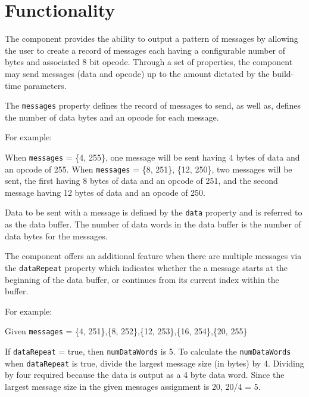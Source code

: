 \section*{Functionality}
\begin{flushleft}

The {\comp} component provides the ability to output a pattern of messages by allowing the user to create a record of messages each having a configurable number of bytes and associated 8 bit opcode. Through a set of properties, the component may send messages (data and opcode) up to the amount dictated by the build-time parameters. \newline

The \texttt{messages} property defines the record of messages to send, as well as, defines the number of data bytes and an opcode for each message. \newline

For example: \newline

When \texttt{messages} = \{4, 255\}, one message will be sent having 4 bytes of data and an opcode of 255. \newline
When \texttt{messages} = \{8, 251\}, \{12, 250\}, two messages will be sent, the first having 8 bytes of data and an opcode of 251, and the second message having 12 bytes of data and an opcode of 250. \newline

Data to be sent with a message is defined by the \texttt{data} property and is referred to as the data buffer. The number of data words in the data buffer is the number of data bytes for the messages. \newline

The component offers an additional feature when there are multiple messages via the \texttt{dataRepeat} property which indicates whether the a message starts at the beginning of the data buffer, or continues from its current index within the buffer. \newline

For example: \newline

Given \texttt{messages} = \{4, 251\},\{8, 252\},\{12, 253\},\{16, 254\},\{20, 255\} \newline

If \texttt{dataRepeat} = true, then \texttt{numDataWords} is 5. To calculate the \texttt{numDataWords} when \texttt{dataRepeat} is true, divide the largest message size (in bytes) by 4. Dividing by four required because the data is output as a 4 byte data word. Since the largest message size in the given messages assignment is 20, 20/4 = 5. \newline


\end{flushleft}
